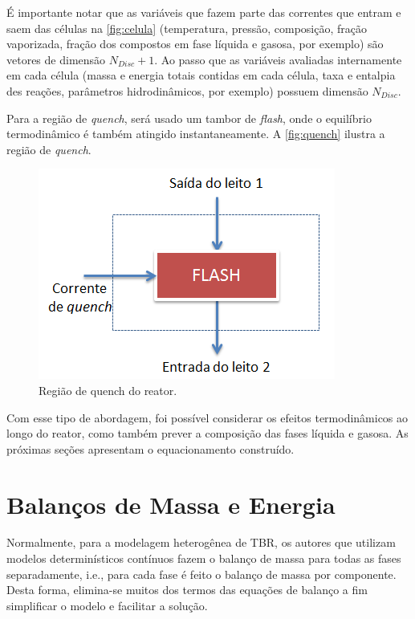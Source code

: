 
É importante notar que as variáveis que fazem parte das correntes que
entram e saem das células na \autoref{fig:celula} (temperatura,
pressão, composição, fração vaporizada, fração dos compostos em fase líquida e
gasosa, por exemplo) são vetores de dimensão $N_{Disc}+1$.
Ao passo que as variáveis avaliadas internamente em cada célula (massa e energia
totais contidas em cada célula, taxa e entalpia des reações, parâmetros
hidrodinâmicos, por exemplo) possuem dimensão $N_{Disc}$.

Para a região de \emph{quench}, será usado um tambor de \emph{flash}, onde o
equilíbrio termodinâmico é também atingido instantaneamente. A
\autoref{fig:quench} ilustra a região de \emph{quench}.

 \begin{figure}[htb]
 \centering \includegraphics[scale=0.75]{images/Chap3/quench.png}
 \caption{Região de quench do reator.}
 \label{fig:quench}
 \end{figure}

Com esse tipo de abordagem, foi possível considerar os efeitos termodinâmicos
ao longo do reator, como também prever a composição das fases líquida e
gasosa. As próximas seções apresentam o equacionamento construído.

\section{Balanços de Massa e Energia} \label{sec:balancomassaenergia}

Normalmente, para a modelagem heterogênea de TBR, os autores que
utilizam modelos determinísticos contínuos fazem o balanço de massa para todas as
fases separadamente, i.e., para cada fase é feito o balanço de massa por
componente. Desta forma, elimina-se muitos dos termos das equações de balanço a
fim simplificar o modelo e facilitar a solução. 


